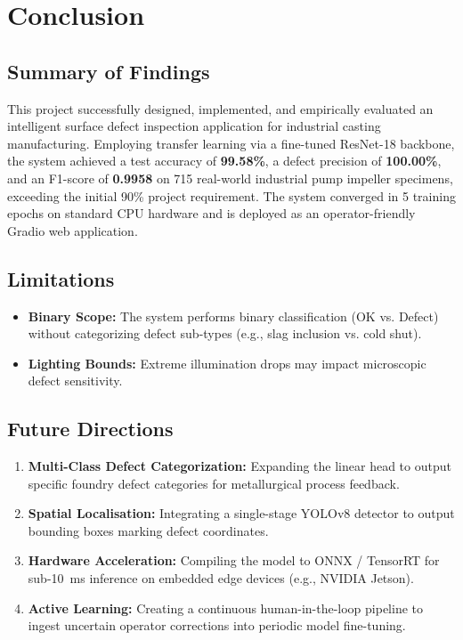 \documentclass[12pt,a4paper]{report}
\begin{document}
\chapter{Conclusion}

\section{Summary of Findings}
This project successfully designed, implemented, and empirically evaluated an intelligent surface defect inspection application for industrial casting manufacturing. Employing transfer learning via a fine-tuned ResNet-18 backbone, the system achieved a test accuracy of \textbf{99.58\%}, a defect precision of \textbf{100.00\%}, and an F1-score of \textbf{0.9958} on 715 real-world industrial pump impeller specimens, exceeding the initial 90\% project requirement. The system converged in 5 training epochs on standard CPU hardware and is deployed as an operator-friendly Gradio web application.

\section{Limitations}
\begin{itemize}
    \item \textbf{Binary Scope:} The system performs binary classification (OK vs. Defect) without categorizing defect sub-types (e.g., slag inclusion vs. cold shut).
    \item \textbf{Lighting Bounds:} Extreme illumination drops may impact microscopic defect sensitivity.
\end{itemize}

\section{Future Directions}
\begin{enumerate}
    \item \textbf{Multi-Class Defect Categorization:} Expanding the linear head to output specific foundry defect categories for metallurgical process feedback.
    \item \textbf{Spatial Localisation:} Integrating a single-stage YOLOv8 detector to output bounding boxes marking defect coordinates.
    \item \textbf{Hardware Acceleration:} Compiling the model to ONNX / TensorRT for sub-10~ms inference on embedded edge devices (e.g., NVIDIA Jetson).
    \item \textbf{Active Learning:} Creating a continuous human-in-the-loop pipeline to ingest uncertain operator corrections into periodic model fine-tuning.
\end{enumerate}

\renewcommand{\bibname}{References}


\end{document}
